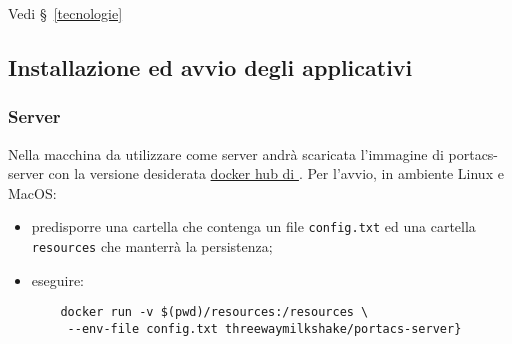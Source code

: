     Vedi \S\ \ref{tecnologie}

    \begin{comment}
    	\item Client:
    \begin{itemize}
    	\item Docker.

    \end{itemize}
    	\item Server:
    \begin{itemize}
    	\item Docker.

    \end{itemize}
    \end{comment}







\subsection{Installazione ed avvio degli applicativi}
    \subsubsection{Server}
    Nella macchina da utilizzare come server andrà scaricata l'immagine di portacs-server con la versione desiderata \href{https://hub.docker.com/r/threewaymilkshake}{docker hub di \group}.
    Per l'avvio, in ambiente Linux e MacOS:
    \begin{itemize}
        \item predisporre una cartella che contenga un file \texttt{config.txt} ed una cartella \texttt{resources} che manterrà la persistenza;
        \item eseguire:
    \begin{verbatim}
    docker run -v $(pwd)/resources:/resources \
     --env-file config.txt threewaymilkshake/portacs-server}
    \end{verbatim}
    \end{itemize}

